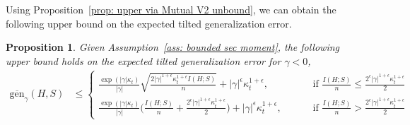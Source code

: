 \documentclass{article}
\theoremstyle{plain}
\theoremstyle{plain}
\newtheorem{proposition}[theorem]{Proposition}
\theoremstyle{definition}
\theoremstyle{remark}
\begin{document}
Using Proposition~\ref{prop: upper via Mutual V2 unbound}, we can obtain the following upper bound on the expected tilted generalization error.
\begin{proposition}\label{prop: expected bound V2 unbound}
 Given Assumption~\ref{ass: bounded sec moment}, the following upper bound holds on the expected tilted generalization error for $\gamma<0$,
        \begin{equation} \nonumber 
        \begin{split}
       \overline{\mathrm{gen}}_{\gamma}(H,S)&\leq \begin{cases}
              \frac{\exp(|\gamma| \kappa_t) }{|\gamma|}\sqrt{\frac{2|\gamma|^{1+\epsilon} \kappa_t^{1+\epsilon} I(H;S)}{n}}+|\gamma|^\epsilon\kappa_t^{1+\epsilon},\qquad & \mbox{ if }\frac{I(H;S)}{n}\leq \frac{2^{\epsilon}|\gamma|^{1+\epsilon} \kappa_t^{1+\epsilon}}{2}\\
              \frac{  \exp(|\gamma| \kappa_t)}{ |\gamma|} \Big(\frac{ I(H;S)}{n}+\frac{2^{\epsilon}|\gamma|^{1+\epsilon} \kappa_t^{1+\epsilon}}{2}\Big)+ |\gamma|^\epsilon\kappa_t^{1+\epsilon},\qquad & \mbox{ if } \frac{I(H;S)}{n}>\frac{2^{\epsilon}|\gamma|^{1+\epsilon} \kappa_t^{1+\epsilon}}{2}
          \end{cases}
       \end{split}
    \end{equation}
\end{proposition}
\end{document}
